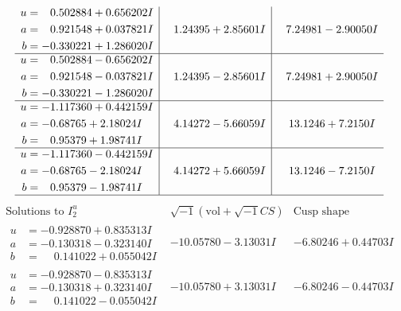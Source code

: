\documentclass[1p]{elsarticle_modified}
\theoremstyle{definition}
\newcommand{\I}{\sqrt{-1}}
\begin{document}
$$\begin{array}{c|c|c}
\begin{aligned}
u &= \phantom{-}0.502884 + 0.656202 I \\
a &= \phantom{-}0.921548 + 0.037821 I \\
b &= -0.330221 + 1.286020 I\end{aligned}
 & \phantom{-}1.24395 + 2.85601 I & \phantom{-}7.24981 - 2.90050 I \\ \hline\begin{aligned}
u &= \phantom{-}0.502884 - 0.656202 I \\
a &= \phantom{-}0.921548 - 0.037821 I \\
b &= -0.330221 - 1.286020 I\end{aligned}
 & \phantom{-}1.24395 - 2.85601 I & \phantom{-}7.24981 + 2.90050 I \\ \hline\begin{aligned}
u &= -1.117360 + 0.442159 I \\
a &= -0.68765 + 2.18024 I \\
b &= \phantom{-}0.95379 + 1.98741 I\end{aligned}
 & \phantom{-}4.14272 - 5.66059 I & \phantom{-}13.1246 + 7.2150 I \\ \hline\begin{aligned}
u &= -1.117360 - 0.442159 I \\
a &= -0.68765 - 2.18024 I \\
b &= \phantom{-}0.95379 - 1.98741 I\end{aligned}
 & \phantom{-}4.14272 + 5.66059 I & \phantom{-}13.1246 - 7.2150 I\\
 \hline 
 \end{array}$$\newpage$$\begin{array}{c|c|c}  
\text{Solutions to }I^u_{2}& \I (\text{vol} + \sqrt{-1}CS) & \text{Cusp shape}\\
 \hline 
\begin{aligned}
u &= -0.928870 + 0.835313 I \\
a &= -0.130318 - 0.323140 I \\
b &= \phantom{-}0.141022 + 0.055042 I\end{aligned}
 & -10.05780 - 3.13031 I & -6.80246 + 0.44703 I \\ \hline\begin{aligned}
u &= -0.928870 - 0.835313 I \\
a &= -0.130318 + 0.323140 I \\
b &= \phantom{-}0.141022 - 0.055042 I\end{aligned}
 & -10.05780 + 3.13031 I & -6.80246 - 0.44703 I \\ \hline\begin{aligned}

\end{aligned}
\end{array}$$
\end{document}
